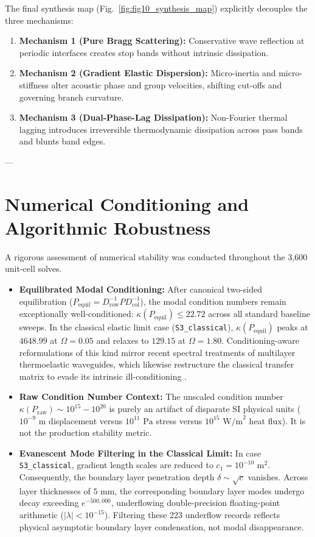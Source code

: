\documentclass[11pt,a4paper]{article}
\begin{document}
The final synthesis map (Fig.~\ref{fig:fig10_synthesis_map}) explicitly decouples the three mechanisms:
\begin{enumerate}
    \item \textbf{Mechanism 1 (Pure Bragg Scattering):} Conservative wave reflection at periodic interfaces creates stop bands without intrinsic dissipation.
    \item \textbf{Mechanism 2 (Gradient Elastic Dispersion):} Micro-inertia and micro-stiffness alter acoustic phase and group velocities, shifting cut-offs and governing branch curvature.
    \item \textbf{Mechanism 3 (Dual-Phase-Lag Dissipation):} Non-Fourier thermal lagging introduces irreversible thermodynamic dissipation across pass bands and blunts band edges.
\end{enumerate}

---

\section{Numerical Conditioning and Algorithmic Robustness}
\label{sec:conditioning}

A rigorous assessment of numerical stability was conducted throughout the 3,600 unit-cell solves.
\begin{itemize}
    \item \textbf{Equilibrated Modal Conditioning:} After canonical two-sided equilibration ($P_{\text{equil}} = D_{\text{row}}^{-1} P D_{\text{col}}^{-1}$), the modal condition numbers remain exceptionally well-conditioned: $\kappa(P_{\text{equil}}) \le 22.72$ across all standard baseline sweeps. In the classical elastic limit case (\texttt{S3\_classical}), $\kappa(P_{\text{equil}})$ peaks at $4648.99$ at $\Omega = 0.05$ and relaxes to $129.15$ at $\Omega = 1.80$. Conditioning-aware reformulations of this kind mirror recent spectral treatments of multilayer thermoelastic waveguides, which likewise restructure the classical transfer matrix to evade its intrinsic ill-conditioning \cite{li2026spectral}.
    \item \textbf{Raw Condition Number Context:} The unscaled condition number $\kappa(P_{\text{raw}}) \sim 10^{15} - 10^{20}$ is purely an artifact of disparate SI physical units ($10^{-9}\text{ m}$ displacement versus $10^{11}\text{ Pa}$ stress versus $10^{15}\text{ W/m}^2$ heat flux). It is not the production stability metric.
    \item \textbf{Evanescent Mode Filtering in the Classical Limit:} In case \texttt{S3\_classical}, gradient length scales are reduced to $c_1 = 10^{-10}\text{ m}^2$. Consequently, the boundary layer penetration depth $\delta \sim \sqrt{c}$ vanishes. Across layer thicknesses of $5\text{ mm}$, the corresponding boundary layer modes undergo decay exceeding $e^{-500,000}$, underflowing double-precision floating-point arithmetic ($|\lambda| < 10^{-15}$). Filtering these 223 underflow records reflects physical asymptotic boundary layer condensation, not modal disappearance.
\end{itemize}
\end{document}
